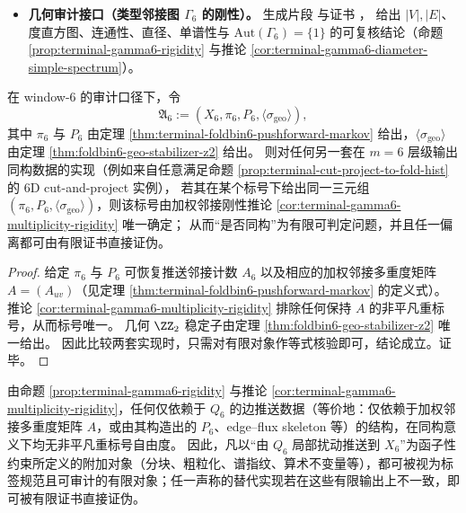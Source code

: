 \begin{itemize}
  与计数直方图片段 
  与证书 ，
  给出逐 \(w\in X_6\) 的 \(\delta_{\min}(w)\) 与预像清单，可直接核验定理 \ref{thm:terminal-foldbin6-fiber-hamming-three-valued} 的 \(\{2,3,5\}\) 三值律。
  \item \textbf{几何审计接口（类型邻接图 \texorpdfstring{$\Gamma_6$}{Gamma6} 的刚性）。}
  \texttt{} 生成片段
  \texttt{}
  与证书 \texttt{}，
  给出 \(|V|,|E|\)、度直方图、连通性、直径、单谱性与 \(\mathrm{Aut}(\Gamma_6)=\{1\}\) 的可复核结论（命题 \ref{prop:terminal-gamma6-rigidity} 与推论 \ref{cor:terminal-gamma6-diameter-simple-spectrum}）。
\end{itemize}

\begin{corollary}\label{cor:terminal-window6-finite-completeness-template}
在 window-\(6\) 的审计口径下，令
\[
\mathfrak{A}_6:=(X_6,\pi_6,P_6,\langle\sigma_{\mathrm{geo}}\rangle),
\]
其中 \(\pi_6\) 与 \(P_6\) 由定理 \ref{thm:terminal-foldbin6-pushforward-markov} 给出，\(\langle\sigma_{\mathrm{geo}}\rangle\) 由定理 \ref{thm:foldbin6-geo-stabilizer-z2} 给出。
则对任何另一套在 \(m=6\) 层级输出同构数据的实现（例如来自任意满足命题 \ref{prop:terminal-cut-project-to-fold-hist} 的 6D cut-and-project 实例），
若其在某个标号下给出同一三元组 \((\pi_6,P_6,\langle\sigma_{\mathrm{geo}}\rangle)\)，则该标号由加权邻接刚性推论 \ref{cor:terminal-gamma6-multiplicity-rigidity} 唯一确定；
从而“是否同构”为有限可判定问题，并且任一偏离都可由有限证书直接证伪。
\end{corollary}
\begin{proof}
给定 \(\pi_6\) 与 \(P_6\) 可恢复推送邻接计数 \(A_6\) 以及相应的加权邻接多重度矩阵 \(A=(A_{uv})\)（见定理 \ref{thm:terminal-foldbin6-pushforward-markov} 的定义式）。
推论 \ref{cor:terminal-gamma6-multiplicity-rigidity} 排除任何保持 \(A\) 的非平凡重标号，从而标号唯一。
几何 \(\ZZ_2\) 稳定子由定理 \ref{thm:foldbin6-geo-stabilizer-z2} 唯一给出。
因此比较两套实现时，只需对有限对象作等式核验即可，结论成立。证毕。
\end{proof}

\begin{remark}\label{rem:terminal-window6-structure-defined-uniqueness}
由命题 \ref{prop:terminal-gamma6-rigidity} 与推论 \ref{cor:terminal-gamma6-multiplicity-rigidity}，任何仅依赖于 \(Q_6\) 的边推送数据（等价地：仅依赖于加权邻接多重度矩阵 \(A\)，或由其构造出的 \(P_6\)、edge--flux skeleton 等）的结构，在同构意义下均无非平凡重标号自由度。
因此，凡以“由 \(Q_6\) 局部扰动推送到 \(X_6\)”为函子性约束所定义的附加对象（分块、粗粒化、谱指纹、算术不变量等），都可被视为标签规范且可审计的有限对象；任一声称的替代实现若在这些有限输出上不一致，即可被有限证书直接证伪。
\end{remark}

